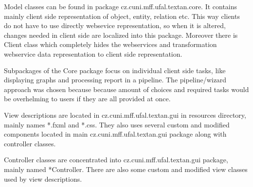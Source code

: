 Model classes can be found in package cz.cuni.mff.ufal.textan.core. It contains
mainly client side representation of object, entity, relation etc. This way
clients do not have to use directly websevice representation, so when it is
altered, changes needed in client side are localized into this package. Moreover
there is Client class which completely hides the webservices and transformation
webservice data representation to client side representation.

Subpackages of the Core package focus on individual client side tasks, like
displaying graphs and processing report in a pipeline. The pipeline/wizard
approach was chosen because because amount of choices and required tasks would
be overhelming to users if they are all provided at once.

View descriptions are located in cz.cuni.mff.ufal.textan.gui in resources
directory, mainly names *.fxml and *.css. They also uses several custom and
modified components located in main cz.cuni.mff.ufal.textan.gui package along
with controller classes.

Controller classes are concentrated into cz.cuni.mff.ufal.textan.gui package,
mainly named *Controller. There are also some custom and modified view classes
used by view descriptions.